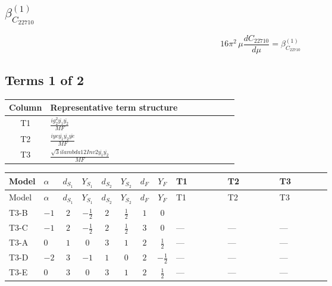 \documentclass[8pt]{article}
\begin{document}
\begin{landscape}
\section*{$\beta_{C_{22710}}^{(1)}$}
\[16\pi^2\,\mu\frac{d C_{22710}}{d\mu}=\beta_{C_{22710}}^{(1)}\]
\subsection*{Terms 1 of 2}
\begin{center}
\begin{tabular}{@{}c >{\raggedright\arraybackslash}p{0.82\linewidth}@{}}
\toprule
Column & Representative term structure \\
\midrule
T1 & \(\displaystyle \frac{i g_{2}^{2} \overline{y_{1}} \overline{y_{2}}}{MF}\) \\
\midrule
T2 & \(\displaystyle \frac{i ye \overline{y_{1}} \overline{y_{2}} \overline{ye}}{MF}\) \\
\midrule
T3 & \(\displaystyle \frac{\sqrt{3} i lambda12Inv2 \overline{y_{1}} \overline{y_{2}}}{MF}\) \\
\midrule
\bottomrule
\end{tabular}
\end{center}
\smallskip
\tiny
\begin{longtable}{@{}llcccccc >{\raggedright\arraybackslash}p{0.21\linewidth} >{\raggedright\arraybackslash}p{0.21\linewidth} >{\raggedright\arraybackslash}p{0.21\linewidth}@{}}
\toprule
Model & $\alpha$ & $d_{S_1}$ & $Y_{S_1}$ & $d_{S_2}$ & $Y_{S_2}$ & $d_F$ & $Y_F$ & T1 & T2 & T3 \\
\midrule
\endfirsthead
\toprule
Model & $\alpha$ & $d_{S_1}$ & $Y_{S_1}$ & $d_{S_2}$ & $Y_{S_2}$ & $d_F$ & $Y_F$ & T1 & T2 & T3 \\
\midrule
\endhead
T3-B & $-1$ & $2$ & $-\frac{1}{2}$ & $2$ & $\frac{1}{2}$ & $1$ & $0$ & \scriptsize\adjustbox{max width=\linewidth}{$\begin{gathered} \frac{3 i g_{2}^{2} \overline{y_{1}} \overline{y_{2}}}{4 MF}\end{gathered}$} & \scriptsize\adjustbox{max width=\linewidth}{$\begin{gathered} - \frac{i ye \overline{y_{1}} \overline{y_{2}} \overline{ye}}{4 MF}\end{gathered}$} & \scriptsize\adjustbox{max width=\linewidth}{$\begin{gathered} \frac{\sqrt{3} i lambda12Inv2 \overline{y_{1}} \overline{y_{2}}}{3 MF}\end{gathered}$} \\
\midrule
T3-C & $-1$ & $2$ & $-\frac{1}{2}$ & $2$ & $\frac{1}{2}$ & $3$ & $0$ & --- & --- & --- \\
\midrule
T3-A & $0$ & $1$ & $0$ & $3$ & $1$ & $2$ & $\frac{1}{2}$ & --- & --- & --- \\
\midrule
T3-D & $-2$ & $3$ & $-1$ & $1$ & $0$ & $2$ & $-\frac{1}{2}$ & --- & --- & --- \\
\midrule
T3-E & $0$ & $3$ & $0$ & $3$ & $1$ & $2$ & $\frac{1}{2}$ & --- & --- & --- \\
\midrule
\bottomrule
\end{longtable}
\clearpage

\end{landscape}
\end{document}
